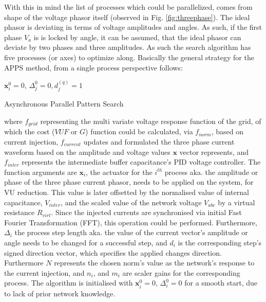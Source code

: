         With this in mind the list of processes which could be parallelized, comes from shape of the voltage phasor itself (observed in Fig. \ref{fig:threephase}). The ideal phasor is deviating in terms of voltage amplitudes and angles. As such, if the first phase $V_a$ is is locked by angle, it can be assumed, that the ideal phasor can deviate by two phases and three amplitudes. As such the search algorithm has five processes (or axes) to optimize along. Basically the general strategy for the APPS method, from a single process perspective follows: %
        \begin{algorithm}[H]
        \SetAlgoLined
         $\textbf{x}_i^0=0$, $\Delta_j^0=0, d_j^{(q)}=1$\;
         \caption{Asynchronous Parallel Pattern Search}
         \label{algo:APPS}
        \end{algorithm}

        where $f_{grid}$ representing the multi variate voltage response function of the grid, of which the cost ($VUF$ or $G$)
        function could be calculated, via $f_{norm}$, based on current injection, $f_{current}$ updates and formulated the three phase current waveform based on the amplitude and voltage values $\textbf{x}$ vector represents, and $f_{inter}$ represents the intermediate buffer capacitance's PID voltage controller. The function arguments are $\textbf{x}_i$, the actuator for the $i^{th}$ process aka. the amplitude or phase of the three phase current phasor, needs to be applied on the system, for VU reduction. This value is later offsetted by the normalised value of internal capacitance, $V_{inter}$, and the scaled value of the network voltage $V_{abc}$ by a virtual resistance $R_{virt}$. Since the injected currents are synchronised via initial Fast Fourier Transformation (FFT), this operation could be performed. Furthermore, $\Delta_i$ the process step length aka. the value of the current vector's amplitude or angle needs to be changed for a successful step, and $d_i$ is the corresponding step's signed direction vector, which specifies the applied changes direction. Furthermore $N$ represents the chosen norm's value as the network's response to the current injection, and $n_i$, and $m_i$ are scaler gains for the corresponding process. The algorithm is initialised with $\textbf{x}_i^0=0$, $\Delta_i^0=0$ for a smooth start, due to lack of prior network knowledge.

